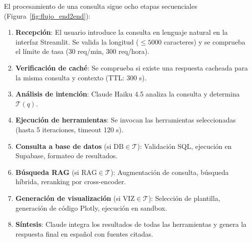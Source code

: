 El procesamiento de una consulta sigue ocho etapas secuenciales (Figura~\ref{fig:flujo_end2end}):

\begin{enumerate}[nosep, leftmargin=*]
  \item \textbf{Recepción}: El usuario introduce la consulta en lenguaje natural en la interfaz Streamlit. Se valida la longitud ($\leq 5000$ caracteres) y se comprueba el límite de tasa (30 req/min, 300 req/hora).
  \item \textbf{Verificación de caché}: Se comprueba si existe una respuesta cacheada para la misma consulta y contexto (TTL: 300 s).
  \item \textbf{Análisis de intención}: Claude Haiku 4.5 analiza la consulta y determina $\mathcal{T}(q)$.
  \item \textbf{Ejecución de herramientas}: Se invocan las herramientas seleccionadas (hasta 5 iteraciones, timeout 120 s).
  \item \textbf{Consulta a base de datos} (si $\text{DB} \in \mathcal{T}$): Validación SQL, ejecución en Supabase, formateo de resultados.
  \item \textbf{Búsqueda RAG} (si $\text{RAG} \in \mathcal{T}$): Augmentación de consulta, búsqueda híbrida, reranking por cross-encoder.
  \item \textbf{Generación de visualización} (si $\text{VIZ} \in \mathcal{T}$): Selección de plantilla, generación de código Plotly, ejecución en sandbox.
  \item \textbf{Síntesis}: Claude integra los resultados de todas las herramientas y genera la respuesta final en español con fuentes citadas.
\end{enumerate}

